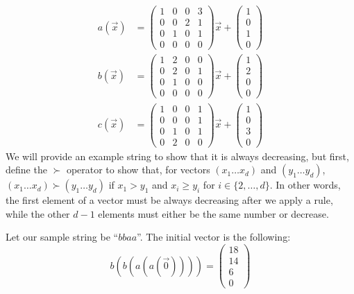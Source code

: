 \begin{align*}
a(\Vec{x}) &= \begin{pmatrix}
1&0&0&3\\
0&0&2&1\\
0&1&0&1\\
0&0&0&0
\end{pmatrix} \Vec{x} + \begin{pmatrix}
1\\
0\\
1\\
0
\end{pmatrix}\\
b(\Vec{x}) &= \begin{pmatrix}
1&2&0&0\\
0&2&0&1\\
0&1&0&0\\
0&0&0&0
\end{pmatrix} \Vec{x} + \begin{pmatrix}
1\\
2\\
0\\
0
\end{pmatrix}\\
c(\Vec{x}) &= \begin{pmatrix}
1&0&0&1\\
0&0&0&1\\
0&1&0&1\\
0&2&0&0
\end{pmatrix} \Vec{x} + \begin{pmatrix}
1\\
0\\
3\\
0
\end{pmatrix}
\end{align*}
We will provide an example string to show that it is always decreasing, but first, define the $\succ$ operator to show that, for vectors $(x_1 \ldots x_d)$ and $(y_1 \ldots y_d)$, $(x_1 \ldots x_d) \succ (y_1 \ldots y_d)$ if $x_1 > y_1$ and $x_i \geq y_i$ for $i \in \{2, \ldots, d\}$. In other words, the first element of a vector must be always decreasing after we apply a rule, while the other $d-1$ elements must either be the same number or decrease. \par
Let our sample string be ``$bbaa$''. The initial vector is the following:
\[
b(b(a(a(\Vec{0}))))= \begin{pmatrix}
18\\14\\6\\0 \end{pmatrix}
\] 
